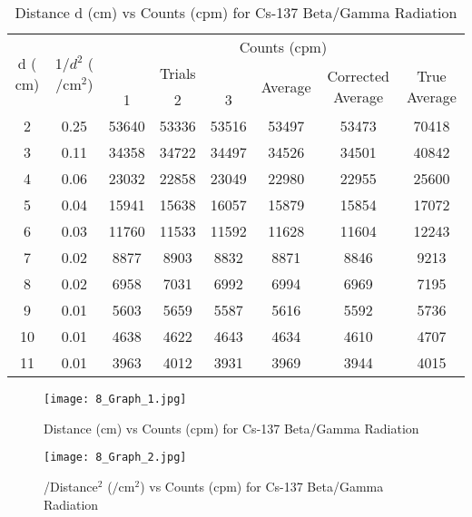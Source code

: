 \documentclass[11pt]{article}
\begin{document}
	\begin{table}[htbp]
		\centering
		\caption{Distance d ($\unit{\centi\meter}$) vs Counts (cpm) for Cs-137 Beta/Gamma Radiation}
		\begin{tabular}{cccccccc}
			\toprule
			\multirow{3}[6]{*}{d ($\unit{\centi\meter}$)} & \multirow{3}[6]{*}{1/$d^2$ ($\unit{\per\centi\meter\squared}$)} & \multicolumn{6}{c}{Counts (cpm)} \\
			\cmidrule{3-8}      &   & \multicolumn{3}{c}{Trials} & \multirow{2}[4]{*}{Average} & \multirow{2}[4]{*}{Corrected Average} & \multirow{2}[4]{*}{True Average} \\
			\cmidrule{3-5}      &   & 1 & 2 & 3 &   &   &  \\
			\midrule
			2 & 0.25 & 53640 & 53336 & 53516 & 53497 & 53473 & 70418 \\
			3 & 0.11 & 34358 & 34722 & 34497 & 34526 & 34501 & 40842 \\
			4 & 0.06 & 23032 & 22858 & 23049 & 22980 & 22955 & 25600 \\
			5 & 0.04 & 15941 & 15638 & 16057 & 15879 & 15854 & 17072 \\
			6 & 0.03 & 11760 & 11533 & 11592 & 11628 & 11604 & 12243 \\
			7 & 0.02 & 8877 & 8903 & 8832 & 8871 & 8846 & 9213 \\
			8 & 0.02 & 6958 & 7031 & 6992 & 6994 & 6969 & 7195 \\
			9 & 0.01 & 5603 & 5659 & 5587 & 5616 & 5592 & 5736 \\
			10 & 0.01 & 4638 & 4622 & 4643 & 4634 & 4610 & 4707 \\
			11 & 0.01 & 3963 & 4012 & 3931 & 3969 & 3944 & 4015 \\
			\bottomrule
		\end{tabular}%
		\label{tab:8_Table}%
	\end{table}%

	\begin{figure}[!ht]
		\centering
		\begin{minipage}{0.45\textwidth}
			\centering
			\texttt{[image: 8\_Graph\_1.jpg]}
			\caption{\centering Distance ($\unit{\centi\meter}$) vs Counts (cpm) for Cs-137 Beta/Gamma Radiation}
			\label{fig:8_Graph_1}
		\end{minipage}
		\hfill
		\begin{minipage}{0.45\textwidth}
			\centering
			\texttt{[image: 8\_Graph\_2.jpg]}
			\caption{/Distance$^2$ ($\unit{\per\centi\meter\squared}$) vs Counts (cpm) for Cs-137 Beta/Gamma Radiation}
			\label{fig:8_Graph_2}
		\end{minipage}
	\end{figure}
	
\end{document}
